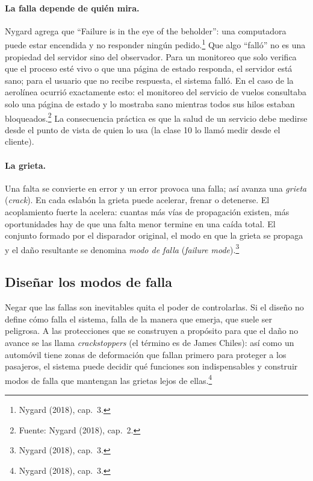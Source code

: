 \documentclass[variant=apuntes,cover=institutional,mode=screen]{ua-engineering-v6-article}
\begin{document}
\paragraph{La falla depende de quién mira.} Nygard agrega que ``Failure is in the eye of the beholder'': una computadora puede estar encendida y no responder ningún pedido.\footnote{Nygard (2018), cap.~3.} Que algo ``falló'' no es una propiedad del servidor sino del observador. Para un monitoreo que solo verifica que el proceso esté vivo o que una página de estado responda, el servidor está sano; para el usuario que no recibe respuesta, el sistema falló. En el caso de la aerolínea ocurrió exactamente esto: el monitoreo del servicio de vuelos consultaba solo una página de estado y lo mostraba sano mientras todos sus hilos estaban bloqueados.\footnote{\historiaaerolinea{} Fuente: Nygard (2018), cap.~2.} La consecuencia práctica es que la salud de un servicio debe medirse desde el punto de vista de quien lo usa (la clase 10 lo llamó medir desde el cliente).

\paragraph{La grieta.} Una falta se convierte en error y un error provoca una falla; así avanza una \emph{grieta} (\emph{crack}). En cada eslabón la grieta puede acelerar, frenar o detenerse. El acoplamiento fuerte la acelera: cuantas más vías de propagación existen, más oportunidades hay de que una falta menor termine en una caída total. El conjunto formado por el disparador original, el modo en que la grieta se propaga y el daño resultante se denomina \emph{modo de falla} (\emph{failure mode}).\footnote{Nygard (2018), cap.~3.}

\subsection{Diseñar los modos de falla}

Negar que las fallas son inevitables quita el poder de controlarlas. Si el diseño no define cómo falla el sistema, falla de la manera que emerja, que suele ser peligrosa. A las protecciones que se construyen a propósito para que el daño no avance se las llama \emph{crackstoppers} (el término es de James Chiles): así como un automóvil tiene zonas de deformación que fallan primero para proteger a los pasajeros, el sistema puede decidir qué funciones son indispensables y construir modos de falla que mantengan las grietas lejos de ellas.\footnote{Nygard (2018), cap.~3.}
\end{document}
